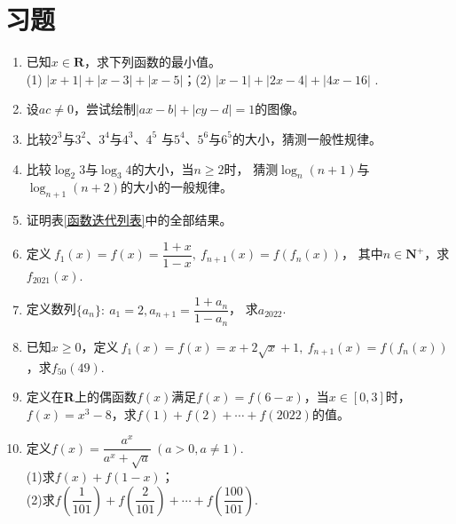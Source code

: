 \section{习题} 
\begin{enumerate}[label={\textbf{\thechapter.\arabic*}},leftmargin=
    \inteval{\myenumleftmargin}pt]

\item  已知$ x\in \textbf{R} $，求下列函数的最小值。\\
(1) $ |x+1|+|x-3|+|x-5| $；\quad (2) $ |x-1|+|2x-4|+|4x-16| $ .

\item 设$ ac\neq 0 $，尝试绘制$ |ax-b|+|cy-d|=1 $的图像。

\item 比较$ 2^3 $与$ 3^2 $、$ 3^4 $与$ 4^3 $、$ 4^5 $
与$ 5^4 $、$ 5^6 $与$ 6^5 $的大小，猜测一般性规律。

\item 比较$ \log_2 3 $与$ \log_3 4 $的大小，当$ n\geq 2 $时，
猜测$ \log_n (n+1) $与$ \log_{n+1} (n+2) $的大小的一般规律。

\item 证明表\ref{函数迭代列表}中的全部结果。

\item 定义$\ f_1(x)=f(x)=\dfrac{1+x}{1-x},\ f_{n+1}(x)=f(f_n(x)) $，
其中$ n \in \textbf{N}^+ $，求$ f_{2021}(x) $. 

\item 定义数列$ \{a_n\}:\ a_1=2,a_{n+1}=\dfrac{1+a_n}{1-a_n} $，
求$ a_{2022} $. 

\item 已知$ x\geq 0 $，定义$\ f_1(x)=f(x)=x+2\sqrt{x}+1,\ f_{n+1}(x)=
f(f_n(x)) $，求$ f_{50}(49) $. 

\item 定义在\textbf{R}上的偶函数$ f(x) $满足$ f(x)=f(6-x) $，当$ x\in [0,3] $时，
$ f(x)=x^3-8 $，求$ f(1)+f(2)+\cdots +f(2022) $的值。

\item 定义$ f(x)=\dfrac{a^x}{a^x+\sqrt{a}} \ (a>0,a\neq 1)$. \\
(1)求$ f(x)+f(1-x) $；\\
(2)求$ f\left(\dfrac{1}{101}\right)+f\left(\dfrac{2}{101}\right)+
\cdots +f\left(\dfrac{100}{101}\right) $. 


\end{enumerate}
